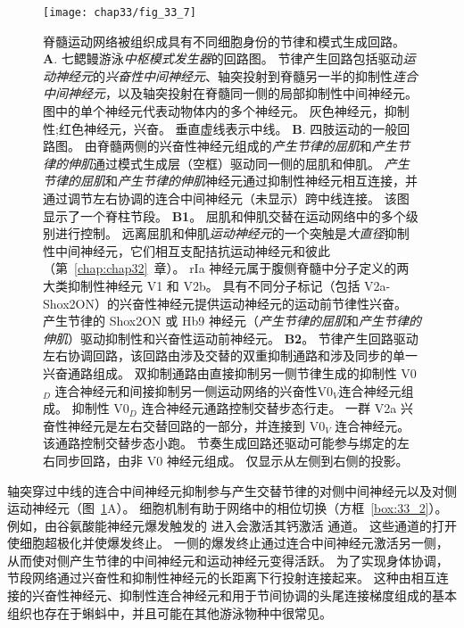 \begin{figure}[htbp]
	\centering
	\texttt{[image: chap33/fig\_33\_7]}
	\caption{脊髓运动网络被组织成具有不同细胞身份的节律和模式生成回路。
	\textbf{A}. 七鳃鳗游泳\textit{中枢模式发生器}的回路图。
	节律产生回路包括驱动\textit{运动神经元}的\textit{兴奋性中间神经元}、轴突投射到脊髓另一半的抑制性\textit{连合中间神经元}，以及轴突投射在脊髓同一侧的局部抑制性中间神经元。
	图中的单个神经元代表动物体内的多个神经元。
	灰色神经元，抑制性;红色神经元，兴奋。
	垂直虚线表示中线\cite{grillner2006biological}。
	\textbf{B}. 四肢运动的一般回路图。
	由脊髓两侧的兴奋性神经元组成的\textit{产生节律的屈肌}和\textit{产生节律的伸肌}通过模式生成层（空框）驱动同一侧的屈肌和伸肌。
	\textit{产生节律的屈肌}和\textit{产生节律的伸肌}神经元通过抑制性神经元相互连接，并通过调节左右协调的连合中间神经元（未显示）跨中线连接。
	该图显示了一个脊柱节段\cite{kiehn2016decoding}。
	\textbf{B1}。 屈肌和伸肌交替在运动网络中的多个级别进行控制。
	远离屈肌和伸肌\textit{运动神经元}的一个突触是\textit{大直径}抑制性中间神经元，它们相互支配拮抗运动神经元和彼此（第~\ref{chap:chap32}~章）。
	rIa 神经元属于腹侧脊髓中分子定义的两大类抑制性神经元 V1 和 V2b。
	具有不同分子标记（包括 V2a-Shox2ON）的兴奋性神经元提供运动神经元的运动前节律性兴奋。
	产生节律的 Shox2ON 或 Hb9 神经元（\textit{产生节律的屈肌}和\textit{产生节律的伸肌}）驱动抑制性和兴奋性运动前神经元。\cite{kiehn2016decoding}
	\textbf{B2}。 节律产生回路驱动左右协调回路，该回路由涉及交替的双重抑制通路和涉及同步的单一兴奋通路组成。
	双抑制通路由直接抑制另一侧节律生成的抑制性 V0$_D$ 连合神经元和间接抑制另一侧运动网络的兴奋性V0$_V$连合神经元组成。
	抑制性 V0$_D$ 连合神经元通路控制交替步态行走。
	一群 V2a 兴奋性神经元是左右交替回路的一部分，并连接到 V0$_V$ 连合神经元。
	该通路控制交替步态小跑。
	节奏生成回路还驱动可能参与绑定的左右同步回路，由非 V0 神经元组成。
	仅显示从左侧到右侧的投影\cite{kiehn2016decoding}。}
	\label{fig:33_7}
\end{figure}


轴突穿过中线的连合中间神经元抑制参与产生交替节律的对侧中间神经元以及对侧运动神经元（图~\ref{fig:33_7}A）。
细胞机制有助于网络中的相位切换（方框~\ref{box:33_2}）。
例如，由谷氨酸能神经元爆发触发的  进入会激活其钙激活  通道。
这些通道的打开使细胞超极化并使爆发终止。
一侧的爆发终止通过连合中间神经元激活另一侧，从而使对侧产生节律的中间神经元和运动神经元变得活跃。
为了实现身体协调，节段网络通过兴奋性和抑制性神经元的长距离下行投射连接起来。
这种由相互连接的兴奋性神经元、抑制性连合神经元和用于节间协调的头尾连接梯度组成的基本组织也存在于蝌蚪中，并且可能在其他游泳物种中很常见。


